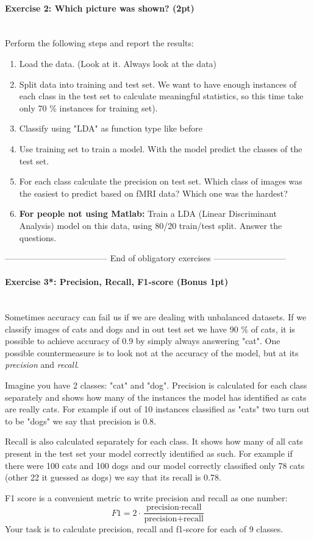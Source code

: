 \documentclass[a4paper,11pt]{article}
\newenvironment{exercise}[3]{\paragraph{Exercise #1: #2 (#3pt)}\ \\}{
\medskip}
\begin{document}
\begin{exercise}{2}{Which picture was shown?}{2}
Perform the following steps and report the results:
\begin{enumerate}
	\item Load the data. (Look at it. Always look at the data)
	\item Split data into training and test set. We want to have enough instances of each class in the test set to calculate meaningful statistics, so this time take only 70 $\%$ instances for training set).
	\item Classify using "LDA" as function type like before
	\item Use training set to train a model. With the model predict the classes of the test set.
	\item For each class calculate the precision on test set. Which class of images was the easiest to predict based on fMRI data? Which one was the hardest?
	\item \textbf{For people not using Matlab:} Train a LDA (Linear Discriminant Analysis) model on this data, using 80/20 train/test split. Answer the questions.
\end{enumerate}
\end{exercise}

------------------------------------  End of obligatory exercises  --------------------------
%
%
\begin{exercise}{3*}{Precision, Recall, F1-score}{Bonus 1}
Sometimes accuracy can fail us if we are dealing with unbalanced datasets. If we classify images of cats and dogs and in out test set we have 90 $\%$ of cats, it is possible to achieve accuracy of 0.9 by simply always answering "cat". One possible countermeasure is to look not at the accuracy of the model, but at its \emph{precision} and \emph{recall}. 

Imagine you have 2 classes: "cat" and "dog". Precision is calculated for each class separately and shows how many of the instances the model has identified as cats are really cats. For example if out of 10 instances classified as "cats" two turn out to be "dogs" we say that precision is 0.8.

Recall is also calculated separately for each class. It shows how many of all cats present in the test set your model correctly identified as such. For example if there were 100 cats and 100 dogs and our model correctly classified only 78 cats (other 22 it guessed as dogs)  we say that its recall is 0.78.

F1 score is a convenient metric to write precision and recall as one number:
$$F1 = 2 \cdot \frac{\text{precision} \cdot \text{recall}}{\text{precision} + \text{recall}}$$
Your task is to calculate precision, recall and f1-score for each of 9 classes.
\end{exercise}
\end{document}
